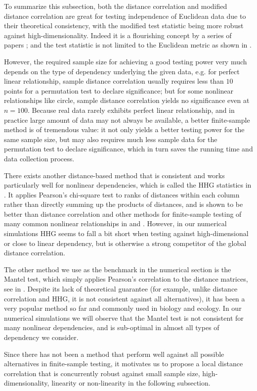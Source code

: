 \documentclass[11pt]{article}
\begin{document}
To summarize this subsection, both the distance correlation and modified distance correlation are great for testing independence of Euclidean data due to their theoretical consistency, with the modified test statistic being more robust against high-dimensionality. Indeed it is a flourishing concept by a series of papers \cite{BakirovRizzoSzekely2006, SzekelyRizzoBakirov2007, SzekelyRizzo2009, BickelXu2009, Kosorok2009, Remillard2009, LiZhongZhu2012, SzekelyRizzo2013a, SzekelyRizzo2013b, SzekelyRizzo2014}; and the test statistic is not limited to the Euclidean metric as shown in \cite{Lyons2013}. 

However, the required sample size for achieving a good testing power very much depends on the type of dependency underlying the given data, e.g. for perfect linear relationship, sample distance correlation usually requires less than $10$ points for a permutation test to declare significance; but for some nonlinear relationships like circle, sample distance correlation yields no significance even at $n=100$. Because real data rarely exhibits perfect linear relationship, and in practice large amount of data may not always be available, a better finite-sample method is of tremendous value: it not only yields a better testing power for the same sample size, but may also requires much less sample data for the permutation test to declare significance, which in turn saves the running time and data collection process. 

There exists another distance-based method that is consistent and works particularly well for nonlinear dependencies, which is called the HHG statistics in \cite{HellerGorfine2013}. It applies Pearson's chi-square test to ranks of distances within each column rather than directly summing up the products of distances, and is shown to be better than distance correlation and other methods for finite-sample testing of many common nonlinear relationships in \cite{GorfineHellerHeller2012} and \cite{HellerGorfine2013}. However, in our numerical simulations HHG seems to fall a bit short when testing against high-dimensional or close to linear dependency, but is otherwise a strong competitor of the global distance correlation. 

The other method we use as the benchmark in the numerical section is the Mantel test, which simply applies Pearson's correlation to the distance matrices, see in \cite{Mantel1967}. Despite its lack of theoretical guarantee (for example, unlike distance correlation and HHG, it is not consistent against all alternatives), it has been a very popular method so far and commonly used in biology and ecology. In our numerical simulations we will observe that the Mantel test is not consistent for many nonlinear dependencies, and is sub-optimal in almost all types of dependency we consider.

Since there has not been a method that perform well against all possible alternatives in finite-sample testing, it motivates us to propose a local distance correlation that is concurrently robust against small sample size, high-dimensionality, linearity or non-linearity in the following subsection.



\end{document}
